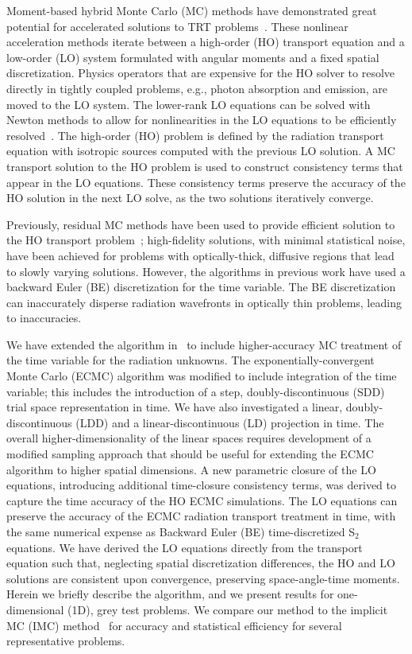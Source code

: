 \documentclass{anstrans}
\begin{document}
Moment-based hybrid Monte Carlo (MC)
methods have demonstrated great potential for accelerated
solutions to TRT problems~\cite{rmc,bolding_nse,holo_rh}.   These nonlinear acceleration methods iterate between a
high-order (HO) transport equation and a low-order (LO) system formulated with angular moments
and a fixed spatial discretization.  Physics operators that
are expensive for the HO solver to resolve directly in tightly coupled problems, e.g., photon absorption and emission,
are moved to the LO system. The lower-rank LO equations can be solved with Newton
methods to allow for nonlinearities in the LO equations to be efficiently
resolved~\cite{willert,bolding_nse}.  The high-order (HO) problem is defined by the radiation transport equation with
isotropic sources computed with the previous LO solution. A MC transport solution to the HO
problem is used to construct consistency terms that appear in the LO equations. These consistency terms preserve the accuracy of the HO
solution in the next LO solve, as the two solutions iteratively converge.

Previously, residual MC methods have been used to provide efficient
solution to the HO transport problem~\cite{rmc,bolding_nse}; high-fidelity solutions,
with minimal statistical noise, have been achieved for problems with optically-thick, diffusive
regions that lead to slowly varying
solutions.  However, the algorithms in previous work have used a backward
Euler (BE) discretization for the time variable.  The BE discretization can inaccurately disperse radiation
wavefronts in optically thin problems, leading to inaccuracies. 

We have extended the algorithm in~\cite{bolding_nse} to include higher-accuracy MC treatment of the time variable for the
radiation unknowns.  The exponentially-convergent Monte Carlo (ECMC)
algorithm was modified to include integration of the time variable;
this includes the introduction of a step, doubly-discontinuous (SDD) trial space representation in
time.  We have also investigated a linear,
doubly-discontinuous (LDD) and a linear-discontinuous
(LD) projection in time.  The overall higher-dimensionality of the linear spaces requires development of a 
modified sampling approach that should be useful for extending the ECMC algorithm to higher spatial
dimensions.  A new
parametric closure of the LO equations, introducing additional time-closure consistency
terms, was derived to capture the time accuracy of the HO
ECMC simulations.  The LO equations can preserve the accuracy of the ECMC radiation transport treatment in
time, with the same numerical expense as Backward Euler (BE) time-discretized S$_2$
equations. We have derived the LO equations directly from the transport equation
such that, neglecting spatial discretization differences,
the HO and LO solutions are consistent upon convergence, preserving space-angle-time moments.
Herein we briefly describe the algorithm, and we present results for
one-dimensional (1D), grey test problems.  We compare our method to the implicit MC
(IMC) method~\cite{fnc} for accuracy and statistical efficiency for several representative problems.
\end{document}
